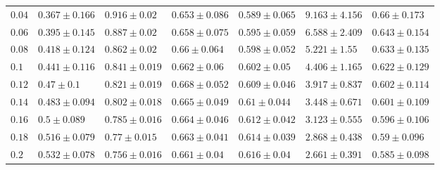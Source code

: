 \documentclass[onecolumn,10pt]{IEEEtran}
\begin{document}
\begin{table}[t]
\begin{tabular}{lllllll}
$0.04$ & $0.367 \pm 0.166$ &  $0.916 \pm 0.02$ & $0.653 \pm 0.086$ & $0.589 \pm 0.065$ &  $9.163 \pm 4.156$ &  $0.66 \pm 0.173$ \\
$0.06$ & $0.395 \pm 0.145$ &  $0.887 \pm 0.02$ & $0.658 \pm 0.075$ & $0.595 \pm 0.059$ &  $6.588 \pm 2.409$ & $0.643 \pm 0.154$ \\
$0.08$ & $0.418 \pm 0.124$ &  $0.862 \pm 0.02$ &  $0.66 \pm 0.064$ & $0.598 \pm 0.052$ &   $5.221 \pm 1.55$ & $0.633 \pm 0.135$ \\
 $0.1$ & $0.441 \pm 0.116$ & $0.841 \pm 0.019$ &  $0.662 \pm 0.06$ &  $0.602 \pm 0.05$ &  $4.406 \pm 1.165$ & $0.622 \pm 0.129$ \\
$0.12$ &    $0.47 \pm 0.1$ & $0.821 \pm 0.019$ & $0.668 \pm 0.052$ & $0.609 \pm 0.046$ &  $3.917 \pm 0.837$ & $0.602 \pm 0.114$ \\
$0.14$ & $0.483 \pm 0.094$ & $0.802 \pm 0.018$ & $0.665 \pm 0.049$ &  $0.61 \pm 0.044$ &  $3.448 \pm 0.671$ & $0.601 \pm 0.109$ \\
$0.16$ &   $0.5 \pm 0.089$ & $0.785 \pm 0.016$ & $0.664 \pm 0.046$ & $0.612 \pm 0.042$ &  $3.123 \pm 0.555$ & $0.596 \pm 0.106$ \\
$0.18$ & $0.516 \pm 0.079$ &  $0.77 \pm 0.015$ & $0.663 \pm 0.041$ & $0.614 \pm 0.039$ &  $2.868 \pm 0.438$ &  $0.59 \pm 0.096$ \\
 $0.2$ & $0.532 \pm 0.078$ & $0.756 \pm 0.016$ &  $0.661 \pm 0.04$ &  $0.616 \pm 0.04$ &  $2.661 \pm 0.391$ & $0.585 \pm 0.098$ \\
\bottomrule
\end{tabular}



\end{table}
\end{document}
